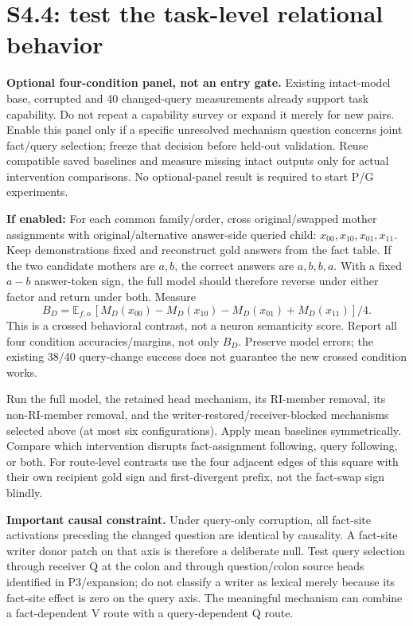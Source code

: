 \documentclass[11pt,a4paper]{article}
\newcommand{\E}{\mathbb{E}}
\begin{document}
\section{S4.4: test the task-level relational behavior}
\label{sec:semantic}
\textbf{Optional four-condition panel, not an entry gate.} Existing intact-model
base, corrupted and 40 changed-query measurements already support task capability.
Do not repeat a capability survey or expand it merely for new pairs. Enable this
panel only if a specific unresolved mechanism question concerns joint fact/query
selection; freeze that decision before held-out validation. Reuse compatible saved
baselines and measure missing intact outputs only for actual intervention comparisons.
No optional-panel result is required to start P/G experiments.

\textbf{If enabled:} For each common family/order, cross original/swapped
mother assignments with original/alternative answer-side queried child:
$x_{00},x_{10},x_{01},x_{11}$. Keep demonstrations fixed and reconstruct gold answers
from the fact table. If the two candidate mothers are $a,b$, the correct answers
are $a,b,b,a$. With a fixed $a-b$ answer-token sign, the full model should therefore
reverse under either factor and return under both. Measure
\[
 B_D=\E_{f,o}\,[M_D(x_{00})-M_D(x_{10})-M_D(x_{01})+M_D(x_{11})]/4.
\]
This is a crossed behavioral contrast, not a neuron semanticity score. Report all four
condition accuracies/margins, not only $B_D$. Preserve model errors; the existing
38/40 query-change success does not guarantee the new crossed condition works.

Run the full model, the retained head mechanism, its RI-member removal, its
non-RI-member removal, and the writer-restored/receiver-blocked mechanisms selected
above (at most six configurations). Apply mean baselines symmetrically. Compare
which intervention disrupts fact-assignment following, query following, or both.
For route-level contrasts use the four adjacent edges of this square with their
own recipient gold sign and first-divergent prefix, not the fact-swap sign blindly.

\textbf{Important causal constraint.} Under query-only corruption, all fact-site
activations preceding the changed question are identical by causality. A fact-site
writer donor patch on that axis is therefore a deliberate null. Test query selection
through receiver Q at the colon and through question/colon source heads identified
in P3/expansion; do not classify a writer as lexical merely because its fact-site
effect is zero on the query axis. The meaningful mechanism can combine a
fact-dependent V route with a query-dependent Q route.
\end{document}
